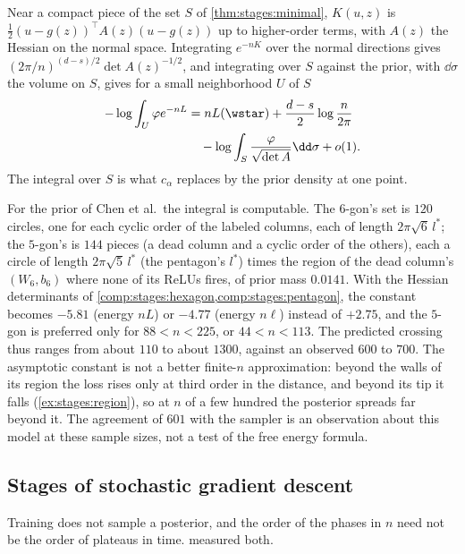 \begin{refsection}
\begin{heuristic}
Near a compact piece of the set $S$ of \cref{thm:stages:minimal}, $K(u,z)$ is $\frac12(u-g(z))^\top A(z)(u-g(z))$ up to higher-order terms, with $A(z)$ the Hessian on the normal space. Integrating $e^{-nK}$ over the normal directions gives $(2\pi/n)^{(d-s)/2}\det A(z)^{-1/2}$, and integrating over $S$ against the prior, with $\dd\sigma$ the volume on $S$, gives for a small neighborhood $U$ of $S$
\[
\begin{aligned}
-\log\int_U\varphi e^{-nL}&=nL(\wstar)+\frac{d-s}2\log\frac n{2\pi}\\
&\quad-\log\int_S\frac{\varphi}{\sqrt{\det A}}\dd\sigma+o(1).
\end{aligned}
\]
The integral over $S$ is what $c_\alpha$ replaces by the prior density at one point.
\end{heuristic}

For the prior of Chen et al.\ the integral is computable. The $6$-gon's set is $120$ circles, one for each cyclic order of the labeled columns, each of length $2\pi\sqrt6\,l^*$; the $5$-gon's is $144$ pieces (a dead column and a cyclic order of the others), each a circle of length $2\pi\sqrt5\,l^*$ (the pentagon's $l^*$) times the region of the dead column's $(W_6,b_6)$ where none of its ReLUs fires, of prior mass $0.0141$. With the Hessian determinants of \cref{comp:stages:hexagon,comp:stages:pentagon}, the constant becomes $-5.81$ (energy $nL$) or $-4.77$ (energy $n\ell$) instead of $+2.75$, and the $5$-gon is preferred only for $88<n<225$, or $44<n<113$. The predicted crossing thus ranges from about $110$ to about $1300$, against an observed $600$ to $700$. The asymptotic constant is not a better finite-$n$ approximation: beyond the walls of its region the loss rises only at third order in the distance, and beyond its tip it falls (\cref{ex:stages:region}), so at $n$ of a few hundred the posterior spreads far beyond it. The agreement of $601$ with the sampler is an observation about this model at these sample sizes, not a test of the free energy formula.

\subsection*{Stages of stochastic gradient descent}

Training does not sample a posterior, and the order of the phases in $n$ need not be the order of plateaus in time. \textcite{ChenEtAl2023} measured both.


\end{refsection}
